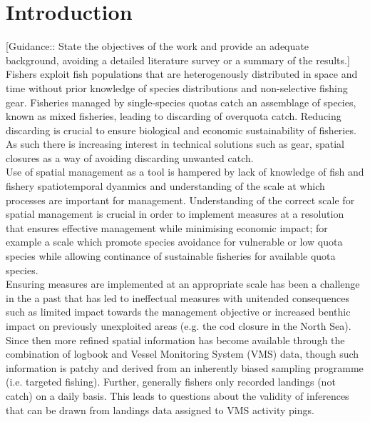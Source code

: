 \documentclass[review]{elsarticle}
\begin{document}
\section{Introduction}

[Guidance:: State the objectives of the work and provide an adequate
background, avoiding a detailed literature survey or a summary of the results.]
\\

Fishers exploit fish populations that are heterogenously distributed in space
and time without prior knowledge of species distributions and non-selective
fishing gear. Fisheries managed by single-species quotas catch an assemblage of
species, known as mixed fisheries, leading to discarding of overquota catch.
Reducing discarding is crucial to ensure biological and economic sustainability
of fisheries. As such there is increasing interest in technical solutions
such as gear, spatial closures as a way of avoiding discarding unwanted catch.
\\

Use of spatial management as a tool is hampered by lack of knowledge of fish
and fishery spatiotemporal dyanmics and understanding of the scale at which
processes are important for management. Understanding of the correct scale for
spatial management is crucial in order to implement measures at a resolution
that ensures effective management\cite{Dunn2016} while minimising economic
impact; for example a scale which promote species avoidance for vulnerable or
low quota species while allowing continance of sustainable fisheries for
available quota species. \\

Ensuring measures are implemented at an appropriate scale has been a challenge
in the a past that has led to ineffectual measures with unitended consequences
such as limited impact towards the management objective or increased benthic
impact on previously unexploited areas (e.g. the cod closure in the North
Sea\cite{Rijnsdorp2001,Dinmore2003}). Since then more refined spatial
information has become available through the combination of logbook and Vessel
Monitoring System (VMS) data\cite{Lee2010, Bastardie2010, Gerritsen2012,
	Mateo2016}, though such information is patchy and derived from an
inherently biased sampling programme (i.e. targeted fishing). Further,
generally fishers only recorded landings (not catch) on a daily basis. This
leads to questions about the validity of inferences that can be drawn from
landings data assigned to VMS activity pings. \\ 
\end{document}
